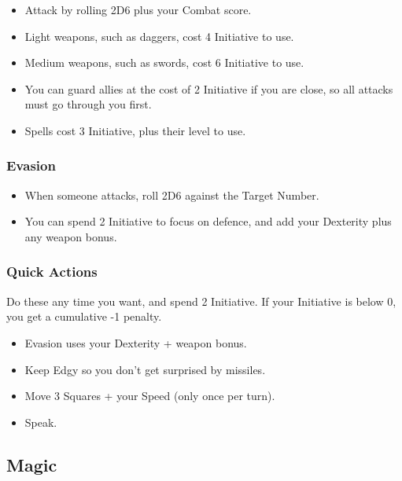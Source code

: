 \begin{multicols}{2}
\begin{itemize}

	\item{Attack by rolling 2D6 plus your Combat score.}
	\item{Light weapons, such as daggers, cost 4 Initiative to use.}
	\item{Medium weapons, such as swords, cost 6 Initiative to use.}
	\item{You can guard allies at the cost of 2 Initiative if you are close, so all attacks must go through you first.}
	\item{Spells cost 3 Initiative, plus their level to use.}

\end{itemize}

\subsubsection{Evasion}

\begin{itemize}

	\item{When someone attacks, roll 2D6 against the Target Number.}
	\item{You can spend 2 Initiative to focus on defence, and add your Dexterity plus any weapon bonus.}

\end{itemize}

\subsubsection{Quick Actions}

Do these any time you want, and spend 2 Initiative.
If your Initiative is below 0, you get a cumulative -1 penalty.

\begin{itemize}

	\item{Evasion uses your Dexterity + weapon bonus.}
	\item{Keep Edgy so you don't get surprised by missiles.}
	\item{Move 3 Squares + your Speed (only once per turn).}
	\item{Speak.}

\end{itemize}

\subsection{Magic}


\end{multicols}
